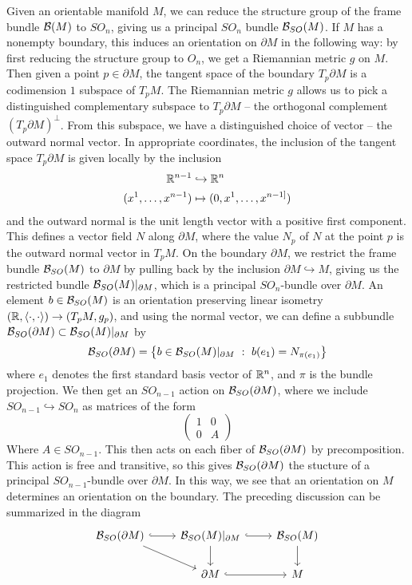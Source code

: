 %
Given an orientable manifold $M$, we can reduce the structure group
of the frame bundle $\mathcal{B}(M)$ to $SO_n$, giving us a principal $SO_n$ bundle
$\mathcal{B}_{SO}(M)$. If $M$ has a nonempty boundary, this induces an orientation on
$\partial M$ in the following way: by first reducing the structure group to $O_n$,
we get a Riemannian metric $g$ on $M$. Then given a point $p \in \partial M$,
the tangent space of the boundary $T_p\partial M$ is a codimension $1$ subspace
of $T_pM$. The Riemannian metric $g$ allows us to pick a distinguished complementary
subspace to $T_p\partial M$ -- the orthogonal complement $(T_p \partial M)^\perp$.
From this subspace, we have a distinguished choice of vector -- the outward
normal vector. In appropriate coordinates, the inclusion of the tangent space
$T_p\partial M$ is given locally by the inclusion
%
\begin{align*}
\mathbb{R}^{n-1} &\hookrightarrow \mathbb{R}^n \\
(x^1, \ldots, x^{n-1}) &\mapsto (0, x^1, \ldots, x^{n-1]})
\end{align*}
%
and the outward normal is the unit length vector with a positive first component.
This defines a vector field $N$ along $\partial M$, where the value $N_p$
of $N$ at the point $p$ is the outward normal vector in $T_pM$.
On the boundary $\partial M$, we restrict the frame bundle $\mathcal{B}_{SO}(M)$
to $\partial M$ by pulling back by the inclusion $\partial M \hookrightarrow M$,
giving us the restricted bundle $\mathcal{B}_{SO}(M)\vert_{\partial M}$, which is a principal
$SO_n$-bundle over $\partial M$. An element $b \in \mathcal{B}_{SO}(M)$ is an orientation
preserving linear isometry $(\mathbb{R}, \langle \cdot,\cdot\rangle) \to (T_pM, g_p)$, and
using the normal vector, we can define a subbundle
$\mathcal{B}_{SO}(\partial M) \subset \mathcal{B}_{SO}(M)\vert_{\partial M}$ by
\[
\mathcal{B}_{SO}(\partial M) = \left\lbrace b \in \mathcal{B}_{SO}(M)\vert_{\partial M} ~:~
b(e_1) = N_{\pi(e_1)} \right\rbrace
\]
where $e_1$ denotes the first standard basis vector of $\mathbb{R}^n$, and $\pi$ is
the bundle projection. We then get an $SO_{n-1}$ action on $\mathcal{B}_{SO}(\partial M)$,
where we include $SO_{n-1} \hookrightarrow SO_n$ as matrices of the form
\[
\begin{pmatrix}
1 & 0 \\
0 & A
\end{pmatrix}
\]
Where $A \in SO_{n-1}$. This then acts on each fiber of $\mathcal{B}_{SO}(\partial M)$
by precomposition. This action is free and transitive, so this gives
$\mathcal{B}_{SO}(\partial M)$ the stucture of a principal $SO_{n-1}$-bundle over
$\partial M$. In this way, we see that an orientation on $M$ determines
an orientation on the boundary. The preceding discussion can be summarized in
the diagram
\[\begin{tikzcd}
\B_{SO}(\partial M) \ar[r, hookrightarrow] \ar[dr] &
\B_{SO}(M)\vert_{\partial M} \ar[d] \ar[r, hookrightarrow] & \B_{SO}(M) \ar[d] \\
& \partial M \ar[r, hookrightarrow] & M
\end{tikzcd}\]

